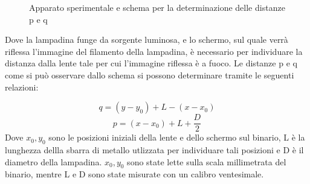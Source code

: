 \documentclass[10pt,twocolumn]{article}
\begin{document}
\begin{figure}[H]
{
    } %
    \caption{Apparato sperimentale e schema per la determinazione delle distanze p e q}
    \label{fig:calibrazione_coordinate}
    \end{figure}

    \noindent Dove la lampadina funge da sorgente luminosa, e lo schermo, sul quale verrà riflessa l'immagine del filamento della lampadina, è necessario per individuare la distanza dalla lente tale per cui l'immagine riflessa è a fuoco.
    Le distanze p e q come si può osservare dallo schema si possono determinare tramite le seguenti relazioni:

    \[
    q = (y - y_0) + L - (x - x_0)
    \]
    \[
    p = (x - x_0) + L + \frac{D}{2}
    \]
    Dove $x_{0},y_{0}$ sono le posizioni iniziali della lente e dello schermo sul binario, L è la lunghezza dellla sbarra di metallo utlizzata per individuare tali posizioni e D è il diametro della lampadina.
    $x_{0},y_{0}$ sono state lette sulla scala millimetrata del binario, mentre L e D sono state misurate con un calibro ventesimale. 
\end{document}
